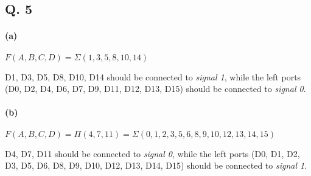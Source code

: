\subsection*{Q. 5}
\paragraph{(a)}$F(A, B, C, D)=\Sigma(1, 3, 5, 8, 10, 14)$
\par D1, D3, D5, D8, D10, D14 should be connected to \emph{signal 1}, while the left ports (D0, D2, D4, D6, D7, D9, D11, D12, D13, D15) should be connected to \emph{signal 0}.
\paragraph{(b)}$F(A, B, C, D)=\Pi(4, 7, 11)=\Sigma(0, 1, 2, 3, 5, 6, 8, 9, 10, 12, 13, 14, 15)$
\par D4, D7, D11 should be connected to \emph{signal 0}, while the left ports (D0, D1, D2, D3, D5, D6, D8, D9, D10, D12, D13, D14, D15) should be connected to \emph{signal 1}.